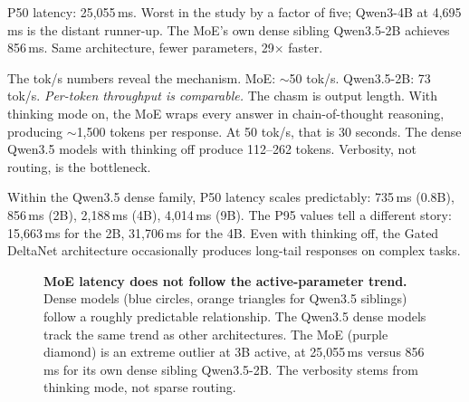 \documentclass[11pt]{article}
\begin{document}
P50 latency: 25,055\,ms.  Worst in the study by a factor of five; Qwen3-4B at 4,695\,ms is the distant runner-up.  The MoE's own dense sibling Qwen3.5-2B achieves 856\,ms.  Same architecture, fewer parameters, 29$\times$ faster.

The tok/s numbers reveal the mechanism.  MoE: ${\sim}$50 tok/s.  Qwen3.5-2B: 73 tok/s.  \emph{Per-token throughput is comparable.} The chasm is output length.  With thinking mode on, the MoE wraps every answer in chain-of-thought reasoning, producing ${\sim}$1,500 tokens per response.  At 50 tok/s, that is 30 seconds.  The dense Qwen3.5 models with thinking off produce 112--262 tokens.  Verbosity, not routing, is the bottleneck.

Within the Qwen3.5 dense family, P50 latency scales predictably: 735\,ms (0.8B), 856\,ms (2B), 2,188\,ms (4B), 4,014\,ms (9B).  The P95 values tell a different story: 15,663\,ms for the 2B, 31,706\,ms for the 4B.  Even with thinking off, the Gated DeltaNet architecture occasionally produces long-tail responses on complex tasks.

\begin{figure}[t]
\centering
{}
\caption{\textbf{MoE latency does not follow the active-parameter trend.} Dense models (blue circles, orange triangles for Qwen3.5 siblings) follow a roughly predictable relationship.  The Qwen3.5 dense models track the same trend as other architectures.  The MoE (purple diamond) is an extreme outlier at 3B active, at 25,055\,ms versus 856\,ms for its own dense sibling Qwen3.5-2B.  The verbosity stems from thinking mode, not sparse routing.}
\label{fig:latency-vs-active}
\end{figure}
\end{document}
